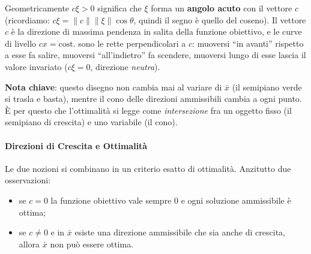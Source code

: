 \documentclass[12pt]{extarticle} %
\begin{document}
\noindent Geometricamente $c\xi > 0$ significa che $\xi$ forma un \textbf{angolo acuto} con il vettore $c$ (ricordiamo: $c\xi = \|c\|\|\xi\|\cos\theta$, quindi il segno è quello del coseno). Il vettore $c$ è la direzione di massima pendenza in salita della funzione obiettivo, e le curve di livello $cx = \text{cost.}$ sono le rette perpendicolari a $c$: muoversi ``in avanti'' rispetto a esse fa salire, muoversi ``all'indietro'' fa scendere, muoversi lungo di esse lascia il valore invariato ($c\xi = 0$, direzione \emph{neutra}).

\begin{center}
\end{center}
\noindent \textbf{Nota chiave}: questo disegno non cambia mai al variare di $\bar{x}$ (il semipiano verde si trasla e basta), mentre il cono delle direzioni ammissibili cambia a ogni punto. È per questo che l'ottimalità si legge come \emph{intersezione} fra un oggetto fisso (il semipiano di crescita) e uno variabile (il cono).

\paragraph{Direzioni di Crescita e Ottimalità}
Le due nozioni si combinano in un criterio esatto di ottimalità. Anzitutto due osservazioni:
\begin{itemize}
    \item se $c = 0$ la funzione obiettivo vale sempre $0$ e ogni soluzione ammissibile è ottima;
    \item se $c \ne 0$ e in $\bar{x}$ esiste una direzione ammissibile che sia anche di crescita, allora $\bar{x}$ non può essere ottima.
\end{itemize}
\end{document}
